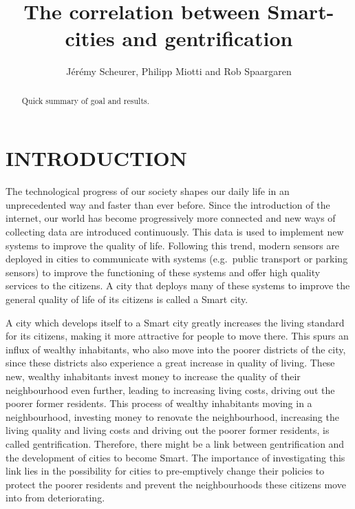 \documentclass[a4paper, 10pt, conference]{ieeeconf}      %
\title{\LARGE \bf The correlation between Smart-cities and gentrification }
\author{Jérémy Scheurer, Philipp Miotti and Rob Spaargaren}
\begin{document}
\maketitle
\thispagestyle{empty}
\pagestyle{empty}


\begin{abstract}


Quick summary of goal and results. 

\end{abstract}


\section{INTRODUCTION}
\label{sec:Introduction}
The technological progress of our society shapes our daily life in an unprecedented
way and faster than ever before. Since the introduction of the internet, our world 
has become progressively more connected and new ways of collecting data are introduced
continuously. This data is used to implement new systems to improve the quality of life.
Following this trend, modern sensors are deployed in cities to communicate with systems
(e.g.\ public transport or parking sensors) to improve the functioning of these systems 
and offer high quality services to the citizens. A city that deploys many of these systems
to improve the general quality of life of its citizens is called a Smart city.

A city which develops itself to a Smart city greatly increases the living standard
for its citizens, making it more attractive for people to move there. This spurs an 
influx of wealthy inhabitants, who also move into the poorer districts of the city,
since these districts also experience a great increase in quality of living. These new,
wealthy inhabitants invest money to increase the quality of their neighbourhood even further,
leading to increasing living costs, driving out the poorer former residents. This 
process of wealthy inhabitants moving in a neighbourhood, investing money to renovate
the neighbourhood, increasing the living quality and living costs and
driving out the poorer former residents, is called gentrification. Therefore, 
there might be a link between gentrification and the development of cities to become Smart.
The importance of investigating this link lies in the possibility for cities to pre-emptively
change their policies to protect the poorer residents and prevent the neighbourhoods these
citizens move into from deteriorating.
\end{document}
